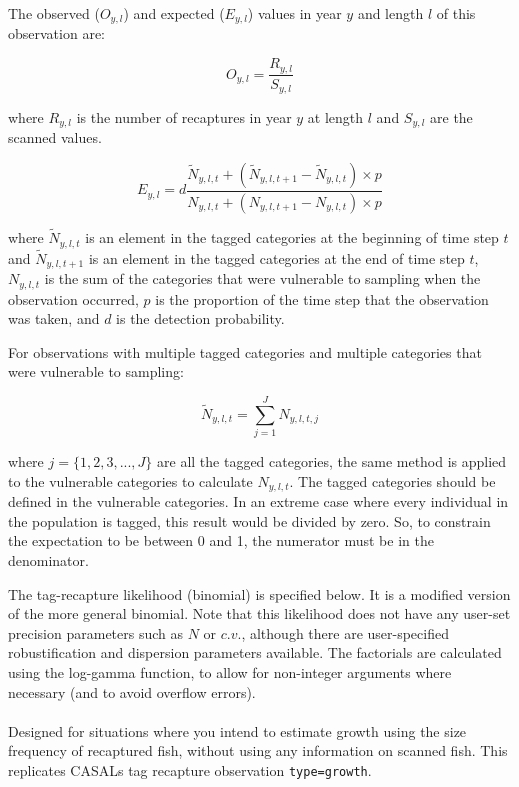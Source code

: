 The observed ($O_{y,l}$) and expected ($E_{y,l}$) values in year $y$ and length $l$ of this observation are:

\begin{equation}
	O_{y,l} = \frac{R_{y,l}}{S_{y,l}}
\end{equation}

where $R_{y,l}$ is the number of recaptures in year $y$ at length $l$ and $S_{y,l}$ are the scanned values.

\begin{equation}
	E_{y,l} = d \frac{\tilde{N}_{y,l,t} +  (\tilde{N}_{y,l,t + 1} - \tilde{N}_{y,l,t}) \times p}
	{N_{y,l,t} + (N_{y,l,t+1} - N_{y,l,t}) \times p}
\end{equation}

where $\tilde{N}_{y,l,t}$ is an element in the tagged categories at the beginning of time step $t$ and $\tilde{N}_{y,l,t + 1}$ is an element in the tagged categories at the end of time step $t$, $N_{y,l,t}$ is the sum of the categories that were vulnerable to sampling when the observation occurred, $p$ is the proportion of the time step that the observation was taken, and $d$ is the detection probability.

For observations with multiple tagged categories and multiple categories that were vulnerable to sampling:

\begin{equation}
	\tilde{N}_{y,l,t} = \sum_{j = 1}^{J} N_{y,l,t,j}
\end{equation}

where $j = \{1,2,3,...,J\}$  are all the tagged categories, the same method is applied to the vulnerable categories to calculate $N_{y,l,t}$. The tagged categories should be defined in the vulnerable categories. In an extreme case where every individual in the population is tagged, this result would be divided by zero. So, to constrain the expectation to be between 0 and 1, the numerator must be in the denominator.

The tag-recapture likelihood (binomial) is specified below. It is a modified version of the more general binomial. Note that this likelihood does not have any user-set precision parameters such as $N$ or $c.v.$, although there are user-specified robustification and dispersion parameters available. The factorials are calculated using the log-gamma function, to allow for non-integer arguments where necessary (and to avoid overflow errors).

\paragraph*{\label{sec:Observation-TagRecaptureByLengthForGrowth}}
Designed for situations where you intend to estimate growth using the size frequency of recaptured fish, without using any information on scanned fish. This replicates CASALs tag recapture observation \texttt{type=growth}. 
 
